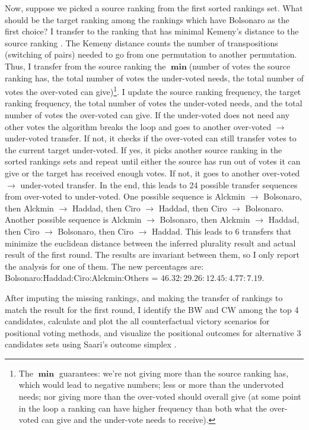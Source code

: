\documentclass[hidelinks,11pt]{article}
\begin{document}
Now, suppose we picked a source ranking from the first sorted rankings set. What
should be the target ranking among the rankings which have Bolsonaro as the
first choice? I transfer to the ranking that has minimal Kemeny's distance to
the source ranking \parencite{nurmi2002voting}. The Kemeny distance counts the
number of transpositions (switching of pairs) needed to go from one permutation
to another permutation. Thus, I transfer from the source ranking the
\(\operatorname{\mathbf{min}}\)(number of votes the source ranking has, the
total number of votes the under-voted needs, the total number of votes the
over-voted can give)\footnote{The \(\operatorname{\mathbf{min}}\) guarantees:
  we're not giving more than the source ranking has, which would lead to
  negative numbers; less or more than the undervoted needs; nor giving more than
  the over-voted should overall give (at some point in the loop a ranking can
  have higher frequency than both what the over-voted can give and the
  under-vote needs to receive).}. I update the source ranking frequency, the
target ranking frequency, the total number of votes the under-voted needs, and
the total number of votes the over-voted can give. If the under-voted does not
need any other votes the algorithm breaks the loop and goes to another
over-voted \(\to\) under-voted transfer. If not, it checks if the over-voted can
still transfer votes to the current target under-voted. If yes, it picks another
source ranking in the sorted rankings sets and repeat until either the source
has run out of votes it can give or the target has received enough votes. If
not, it goes to another over-voted \(\to\) under-voted transfer. In the end,
this leads to 24 possible transfer sequences from over-voted to under-voted. One
possible sequence is Alckmin \(\to\) Bolsonaro, then Alckmin \(\to\) Haddad,
then Ciro \(\to\) Haddad, then Ciro \(\to\) Bolsonaro. Another possible sequence
is Alckmin \(\to\) Bolsonaro, then Alckmin \(\to\) Haddad, then Ciro \(\to\)
Bolsonaro, then Ciro \(\to\) Haddad. This leads to 6 transfers that minimize the
euclidean distance between the inferred plurality result and actual result of
the first round. The results are invariant between them, so I only report the
analysis for one of them. The new percentages are:
Bolsonaro:Haddad:Ciro:Alckmin:Others = \(46.32:29.26:12.45:4.77:7.19 \).

After imputing the missing rankings, and making the transfer of rankings to
match the result for the first round, I identify the BW and CW among the top 4
candidates, calculate and plot the all counterfactual victory scenarios for
positional voting methods, and visualize the positional outcomes for alternative
3 candidates sets using Saari's outcome simplex \parencite{saari2012geometry}.
\end{document}

